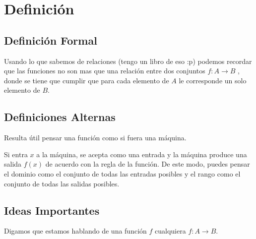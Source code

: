 \documentclass[12pt, fleqn]{report}                             %
\theoremstyle{break}                                            %
\begin{document}
        \section{Definición}

            \subsection*{Definición Formal}
                Usando lo que sabemos de relaciones (tengo un libro de eso :p) podemos recordar
                que las funciones no son mas que una relación entre dos conjuntos $f : A \to B$
                , donde se tiene que cumplir que para cada elemento de $A$ le corresponde un
                solo elemento de $B$.


            \subsection*{Definiciones Alternas}
            Resulta útil pensar una función como si fuera una máquina.

            Si entra $x$ a la máquina, se acepta como una entrada y la máquina produce una
            salida $f(x)$ de acuerdo con la regla de la función. De este modo, puedes pensar
            el dominio como el conjunto de todas las entradas posibles y el rango como el
            conjunto de todas las salidas posibles.

            \subsection{Ideas Importantes}

                Digamos que estamos hablando de una función $f$ cualquiera $f: A \to B$.
\end{document}
